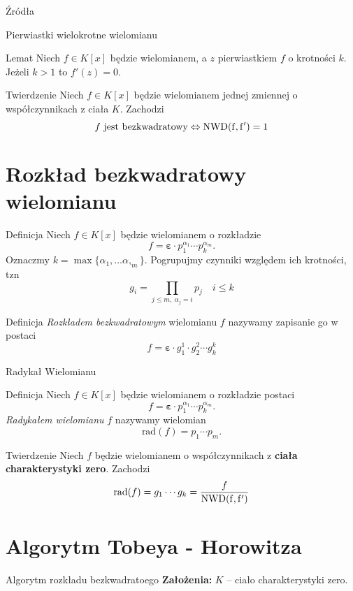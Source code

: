 \documentclass{beamer}
\newcommand{\NWD}{\rm{NWD}}
\newcommand{\rad}{\textrm{rad}}
\renewcommand{\epsilon}{\bm{\varepsilon}}
\begin{document}
\begin{frame}{Źródła}
\begin{frame}{Pierwiastki wielokrotne wielomianu}
    \begin{block}{Lemat}
        Niech $f \in K[x]$ będzie wielomianem, a $z$ pierwiastkiem $f$ o krotności $k$.
        Jeżeli $k > 1$ to $f'(z) = 0$. 
    \end{block}
    \pause 
    \begin{block}{Twierdzenie}
        Niech $f \in K[x]$ będzie wielomianem jednej zmiennej o współczynnikach z ciała $K$. Zachodzi 
        $$f \text{ jest bezkwadratowy} \Leftrightarrow \NWD(f,f') = 1$$
    \end{block}
\end{frame}

\section{Rozkład bezkwadratowy wielomianu}
\begin{frame}{Definicja}
    Niech $f \in K[x]$ będzie wielomianem o rozkładzie 
    $$f = \epsilon \cdot p_1^{\alpha_1} \cdots p_k^{\alpha_m}.$$
    Oznaczmy $k = \max \{\alpha_1 , \ldots \alpha,_m\}$.
    Pogrupujmy czynniki względem ich krotności, tzn 
    $$ g_i = \prod_{j \leq m, \ \alpha_j = i}p_j \quad i \leq k $$
    \begin{block}{Definicja}
        \textit{Rozkładem bezkwadratowym} wielomianu $f$ nazywamy zapisanie go w postaci
        $$f = \epsilon \cdot g_1^{1} \cdot g_2^2 \cdots g_k^k$$
    \end{block}
\end{frame}

\begin{frame}{Radykał Wielomianu}
    \begin{block}{Definicja}
        Niech $f \in K[x]$ będzie wielomianem o rozkładzie postaci
        $$f =\epsilon \cdot p_1^{\alpha_1} \cdots p_k^{\alpha_m}.$$
        \textit{Radykałem wielomianu} $f$ nazywamy wielomian 
        $$ \rad(f) = p_1 \cdots p_m.$$
    \end{block}
    \pause
    \begin{block}{Twierdzenie}
        Niech $f$ będzie wielomianem  o współczynnikach z \textbf{ciała charakterystyki zero}.
        Zachodzi 
        $$\rad (f) = g_1 \cdots g_k = \frac{f}{\NWD(f,f')}$$
    \end{block}
\end{frame}

\section{Algorytm Tobeya - Horowitza}
\begin{frame}{Algorytm rozkładu bezkwadratoego}
    \textbf{Założenia:} $K$ -- ciało charakterystyki zero. 


\end{frame}
\end{frame}
\end{document}
